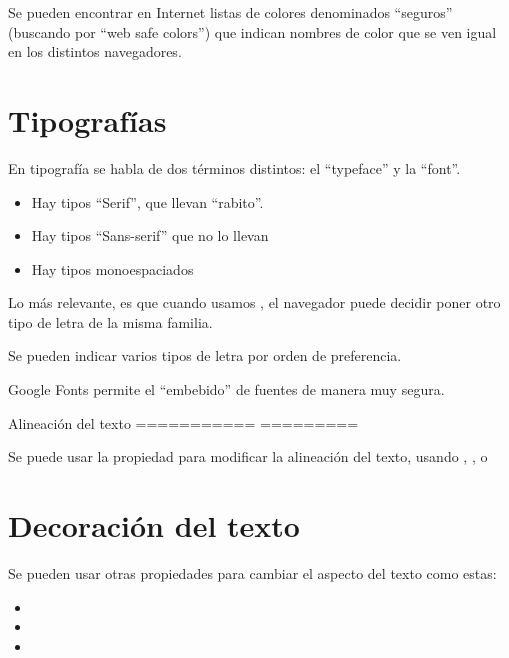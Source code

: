 \documentclass[letterpaper,10pt,spanish]{sphinxmanual}
\begin{document}
Se pueden encontrar en Internet listas de colores denominados ``seguros'' (buscando por ``web safe colors'') que indican nombres de color que se ven igual en los distintos navegadores.


\section{Tipografías}
\label{tema3:tipografias}
En tipografía se habla de dos términos distintos: el ``typeface'' y la ``font''.
\begin{itemize}
\item {} 
Hay tipos ``Serif'', que llevan ``rabito''.

\item {} 
Hay tipos ``Sans-serif'' que no lo llevan

\item {} 
Hay tipos monoespaciados

\end{itemize}

Lo más relevante, es que cuando usamos , el navegador puede decidir poner otro tipo de letra de la misma familia.

Se pueden indicar varios tipos de letra por orden de preferencia.

Google Fonts permite el ``embebido'' de fuentes de manera muy segura.

Alineación del texto
===========     =========

Se puede usar la propiedad  para modificar la alineación del texto, usando , ,  o 


\section{Decoración del texto}
\label{tema3:decoracion-del-texto}
Se pueden usar otras propiedades para cambiar
el aspecto del texto como estas:
\begin{itemize}
\item {} 

\item {} 

\item {} 

\end{itemize}
\end{document}
